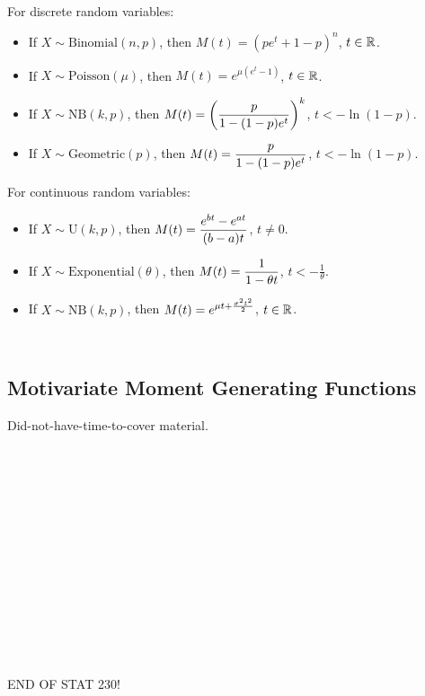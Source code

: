 \pagebreak

\begin{proposition}
    \phantom{}\\
    For discrete random variables:
    \begin{itemize} \itemsep 1.5pt
        \item If $X \sim \text{Binomial}(n,p)$, then $M(t) = (pe^t + 1 - p)^n$, $t \in {\mathbb{R}}$.
        \item If $X \sim \text{Poisson}(\mu)$, then $M(t) = e^{\mu (e^t -1)}$, $t \in {\mathbb{R}}$.
        \item If $X \sim \text{NB}(k,p)$, then $\displaystyle M(t) = \left( \frac{p}{1- (1-p)e^t} \right)^k$, $t < - \ln(1-p)$.
        \item If $X \sim \text{Geometric}(p)$, then $\displaystyle M(t) = \frac{p}{1- (1-p)e^t}$, $t < - \ln(1-p)$.
    \end{itemize}
    For continuous random variables:
    \begin{itemize} \itemsep 1.5pt
        \item If $X \sim \text{U}(k,p)$, then $\displaystyle M(t) = \frac{e^{bt} - e^{at}}{(b-a)t}$, $t \neq 0$.
        \item If $X \sim \text{Exponential}(\theta)$, then $\displaystyle M(t) = \frac{1}{1- \theta t}$, $t < - \frac{1}{\theta}$.
        \item If $X \sim \text{NB}(k,p)$, then $\displaystyle M(t) = e^{\mu t + \frac{\sigma^2 t^2}{2}}$, $t \in {\mathbb{R}}$.
    \end{itemize}
\end{proposition}

\phantom{}\\

\subsection{Motivariate Moment Generating Functions}

Did-not-have-time-to-cover material. \\
\phantom{}\\
\phantom{}\\
\phantom{}\\
\phantom{}\\
\phantom{}\\
\phantom{}\\
\phantom{}\\
\phantom{}\\
\phantom{}\\
\phantom{}\\
\phantom{}\\
\phantom{}\\
\phantom{}\\

\begin{center}
    {\LARGE END OF STAT 230!}
\end{center}



\newpage